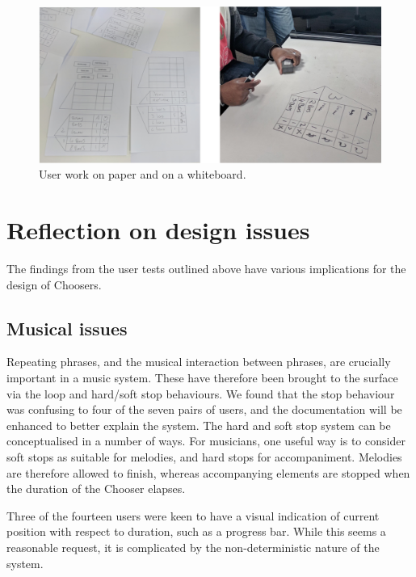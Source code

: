 \documentclass[]{article}
\begin{document}
\begin{figure}
\hypertarget{fig:four}{%
\centering
\includegraphics{./media/image4.png}
\caption{User work on paper and on a whiteboard.}\label{fig:four}
}
\end{figure}

\hypertarget{reflection-on-design-issues}{%
\section{Reflection on design
issues}\label{reflection-on-design-issues}}

The findings from the user tests outlined above have various
implications for the design of Choosers.

\hypertarget{sec:musicalissues}{%
\subsection{Musical issues}\label{sec:musicalissues}}

Repeating phrases, and the musical interaction between phrases, are
crucially important in a music system. These have therefore been brought
to the surface via the loop and hard/soft stop behaviours. We found that
the stop behaviour was confusing to four of the seven pairs of users,
and the documentation will be enhanced to better explain the system. The
hard and soft stop system can be conceptualised in a number of ways. For
musicians, one useful way is to consider soft stops as suitable for
melodies, and hard stops for accompaniment. Melodies are therefore
allowed to finish, whereas accompanying elements are stopped when the
duration of the Chooser elapses.

Three of the fourteen users were keen to have a visual indication of
current position with respect to duration, such as a progress bar. While
this seems a reasonable request, it is complicated by the
non-deterministic nature of the system.
\end{document}
